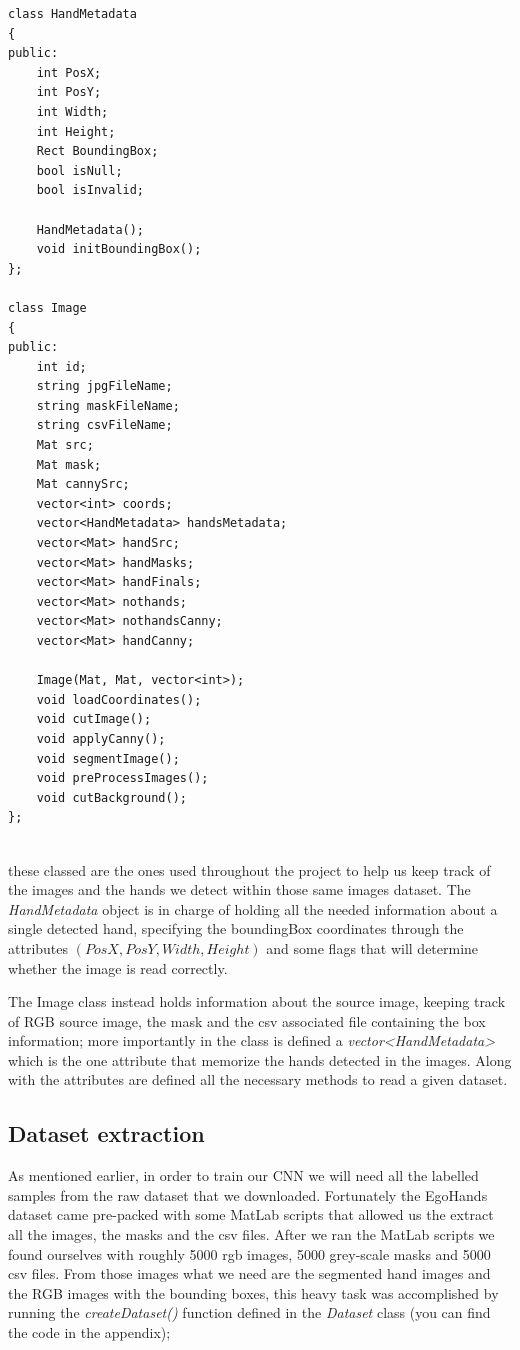 \begin{lstlisting}[]
    class HandMetadata
{
public:
    int PosX;
    int PosY;
    int Width;
    int Height;
    Rect BoundingBox;
    bool isNull;
    bool isInvalid;

    HandMetadata();
    void initBoundingBox();
};

class Image
{
public:
    int id;
    string jpgFileName;
    string maskFileName;
    string csvFileName;
    Mat src;
    Mat mask;
    Mat cannySrc;
    vector<int> coords;
    vector<HandMetadata> handsMetadata;
    vector<Mat> handSrc;
    vector<Mat> handMasks;
    vector<Mat> handFinals;
    vector<Mat> nothands;
    vector<Mat> nothandsCanny;
    vector<Mat> handCanny;

    Image(Mat, Mat, vector<int>);
    void loadCoordinates();
    void cutImage();
    void applyCanny();
    void segmentImage();
    void preProcessImages();
    void cutBackground();
};


\end{lstlisting}

these classed are the ones used throughout the project to help us keep track of
the images and the hands we detect within those same images dataset.
The \textit{HandMetadata} object is in charge of holding all the needed
information about a single detected hand, specifying the boundingBox
coordinates
through the attributes $(PosX, PosY, Width, Height)$ and some flags that will
determine whether the image is read correctly.

The Image class instead holds information about the source image, keeping track
of RGB source image, the mask and the csv associated file containing the box
information;
more importantly in the class is defined a \textit{vector<HandMetadata>} which
is the one attribute that memorize the hands detected in the images. Along with
the attributes
are defined all the necessary methods to read a given dataset.

\subsection{Dataset extraction}
As mentioned earlier, in order to train our CNN we will need all the labelled
samples from the raw dataset that we downloaded. Fortunately the EgoHands
dataset came
pre-packed with some MatLab scripts that allowed us the extract all the images,
the masks and the csv files. After we ran the MatLab scripts we found ourselves
with roughly 5000
rgb images, 5000 grey-scale masks and 5000 csv files. From those images what we
need are the segmented hand images and the RGB images with the bounding boxes,
this heavy
task was accomplished by running the \textit{createDataset()} function defined
in the \textit{Dataset} class (you can find the code in the appendix);

